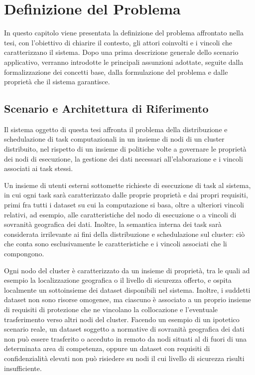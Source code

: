 \chapter{Definizione del Problema}
\label{cap:definizione}

In questo capitolo viene presentata la definizione del problema affrontato nella tesi, con l'obiettivo di chiarire il contesto, gli attori coinvolti e i vincoli che caratterizzano il sistema. Dopo una prima descrizione generale dello scenario applicativo, verranno introdotte le principali assunzioni adottate, seguite dalla formalizzazione dei concetti base, dalla formulazione del problema e dalle proprietà che il sistema garantisce.


\section{Scenario e Architettura di Riferimento}
\label{sec:scenario_applicativo}

Il sistema oggetto di questa tesi affronta il problema della distribuzione e schedulazione di task computazionali in un insieme di nodi di un cluster distribuito, nel rispetto di un insieme di politiche volte a governare le proprietà dei nodi di esecuzione, la gestione dei dati necessari all'elaborazione e i vincoli associati ai task stessi.

Un insieme di utenti esterni sottomette richieste di esecuzione di task al sistema, in cui ogni task sarà caratterizzato dalle proprie proprietà e dai propri requisiti, primi fra tutti i dataset su cui la computazione si basa, oltre a ulteriori vincoli relativi, ad esempio, alle caratteristiche del nodo di esecuzione o a vincoli di sovranità geografica dei dati. Inoltre, la semantica interna dei task sarà considerata irrilevante ai fini della distribuzione e schedulazione sul cluster: ciò che conta sono esclusivamente le caratteristiche e i vincoli associati che li compongono.

Ogni nodo del cluster è caratterizzato da un insieme di proprietà, tra le quali ad esempio la localizzazione geografica o il livello di sicurezza offerto, e ospita localmente un sottoinsieme dei dataset disponibili nel sistema. Inoltre, i suddetti dataset non sono risorse omogenee, ma ciascuno è associato a un proprio insieme di requisiti di protezione che ne vincolano la collocazione e l'eventuale trasferimento verso altri nodi del cluster. Facendo un esempio di un ipotetico scenario reale, un dataset soggetto a normative di sovranità geografica dei dati non può essere trasferito o acceduto in remoto da nodi situati al di fuori di una determinata area di competenza, oppure un dataset con requisiti di confidenzialità elevati non può risiedere su nodi il cui livello di sicurezza risulti insufficiente.

